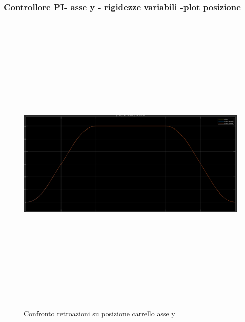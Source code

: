 \documentclass{article}
\begin{document}
\subsubsection{Controllore PI- asse y  - rigidezze variabili -plot posizione}
\begin{figure}[H]
\centering
\includegraphics[width=13cm,height=15cm,keepaspectratio]{./simulink/ldm_variabile/PIDY_POSIZIONE}
\caption{Confronto retroazioni su posizione carrello asse y}
\end{figure}
\end{document}
